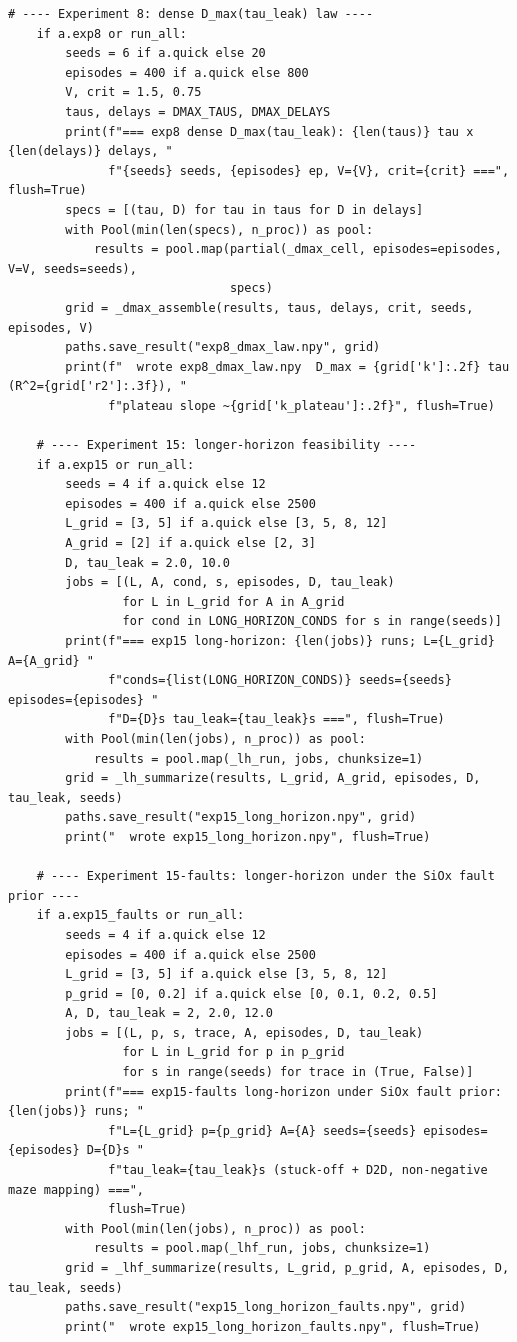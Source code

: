 \begin{lstlisting}[caption={mrl\_trace/maze.py},label={lst:siox-src-maze}]
    # ---- Experiment 8: dense D_max(tau_leak) law ----
    if a.exp8 or run_all:
        seeds = 6 if a.quick else 20
        episodes = 400 if a.quick else 800
        V, crit = 1.5, 0.75
        taus, delays = DMAX_TAUS, DMAX_DELAYS
        print(f"=== exp8 dense D_max(tau_leak): {len(taus)} tau x {len(delays)} delays, "
              f"{seeds} seeds, {episodes} ep, V={V}, crit={crit} ===", flush=True)
        specs = [(tau, D) for tau in taus for D in delays]
        with Pool(min(len(specs), n_proc)) as pool:
            results = pool.map(partial(_dmax_cell, episodes=episodes, V=V, seeds=seeds),
                               specs)
        grid = _dmax_assemble(results, taus, delays, crit, seeds, episodes, V)
        paths.save_result("exp8_dmax_law.npy", grid)
        print(f"  wrote exp8_dmax_law.npy  D_max = {grid['k']:.2f} tau (R^2={grid['r2']:.3f}), "
              f"plateau slope ~{grid['k_plateau']:.2f}", flush=True)

    # ---- Experiment 15: longer-horizon feasibility ----
    if a.exp15 or run_all:
        seeds = 4 if a.quick else 12
        episodes = 400 if a.quick else 2500
        L_grid = [3, 5] if a.quick else [3, 5, 8, 12]
        A_grid = [2] if a.quick else [2, 3]
        D, tau_leak = 2.0, 10.0
        jobs = [(L, A, cond, s, episodes, D, tau_leak)
                for L in L_grid for A in A_grid
                for cond in LONG_HORIZON_CONDS for s in range(seeds)]
        print(f"=== exp15 long-horizon: {len(jobs)} runs; L={L_grid} A={A_grid} "
              f"conds={list(LONG_HORIZON_CONDS)} seeds={seeds} episodes={episodes} "
              f"D={D}s tau_leak={tau_leak}s ===", flush=True)
        with Pool(min(len(jobs), n_proc)) as pool:
            results = pool.map(_lh_run, jobs, chunksize=1)
        grid = _lh_summarize(results, L_grid, A_grid, episodes, D, tau_leak, seeds)
        paths.save_result("exp15_long_horizon.npy", grid)
        print("  wrote exp15_long_horizon.npy", flush=True)

    # ---- Experiment 15-faults: longer-horizon under the SiOx fault prior ----
    if a.exp15_faults or run_all:
        seeds = 4 if a.quick else 12
        episodes = 400 if a.quick else 2500
        L_grid = [3, 5] if a.quick else [3, 5, 8, 12]
        p_grid = [0, 0.2] if a.quick else [0, 0.1, 0.2, 0.5]
        A, D, tau_leak = 2, 2.0, 12.0
        jobs = [(L, p, s, trace, A, episodes, D, tau_leak)
                for L in L_grid for p in p_grid
                for s in range(seeds) for trace in (True, False)]
        print(f"=== exp15-faults long-horizon under SiOx fault prior: {len(jobs)} runs; "
              f"L={L_grid} p={p_grid} A={A} seeds={seeds} episodes={episodes} D={D}s "
              f"tau_leak={tau_leak}s (stuck-off + D2D, non-negative maze mapping) ===",
              flush=True)
        with Pool(min(len(jobs), n_proc)) as pool:
            results = pool.map(_lhf_run, jobs, chunksize=1)
        grid = _lhf_summarize(results, L_grid, p_grid, A, episodes, D, tau_leak, seeds)
        paths.save_result("exp15_long_horizon_faults.npy", grid)
        print("  wrote exp15_long_horizon_faults.npy", flush=True)



\end{lstlisting}
